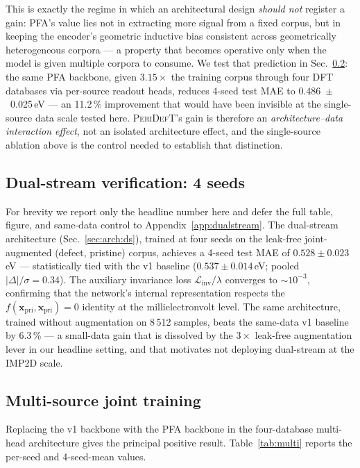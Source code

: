 \documentclass[11pt,a4paper]{article}
\newcommand{\modelname}{\textsc{PeriDefT}}
\begin{document}
This is exactly the regime in which an architectural design
\emph{should not} register a gain: PFA's value lies not in extracting
more signal from a fixed corpus, but in keeping the encoder's
geometric inductive bias consistent across geometrically
heterogeneous corpora --- a property that becomes operative only
when the model is given multiple corpora to consume. We test that
prediction in Sec.~\ref{sec:multi}: the same PFA backbone, given
$3.15\times$ the training corpus through four DFT databases via
per-source readout heads, reduces 4-seed test MAE to
0.486~$\pm$~0.025\,eV --- an 11.2\,\% improvement that would have
been invisible at the single-source data scale tested here.
\modelname's gain is therefore an
\emph{architecture--data interaction effect}, not an isolated
architecture effect, and the single-source ablation above is the
control needed to establish that distinction.

\subsection{Dual-stream verification: 4 seeds}\label{sec:dualstream}

For brevity we report only the headline number here and defer the
full table, figure, and same-data control to
Appendix~\ref{app:dualstream}. The dual-stream architecture
(Sec.~\ref{sec:arch:ds}), trained at four seeds on the leak-free
joint-augmented (defect, pristine) corpus, achieves a 4-seed test MAE
of $0.528 \pm 0.023$\,eV --- statistically tied with the v1 baseline
($0.537 \pm 0.014$\,eV; pooled $|\Delta|/\sigma = 0.34$). The
auxiliary invariance loss
$\mathcal{L}_{\mathrm{inv}}/\lambda$ converges to $\sim 10^{-3}$,
confirming that the network's internal representation respects the
$f(\mathbf{x}_{\mathrm{pri}}, \mathbf{x}_{\mathrm{pri}}) = 0$
identity at the millielectronvolt level. The same architecture,
trained without augmentation on 8\,512 samples, beats the same-data
v1 baseline by 6.3\,\% --- a small-data gain that is dissolved by
the $3\times$ leak-free augmentation lever in our headline setting,
and that motivates not deploying dual-stream at the IMP2D scale.

\subsection{Multi-source joint training}\label{sec:multi}

Replacing the v1 backbone with the PFA backbone in the four-database
multi-head architecture gives the principal positive result.
Table~\ref{tab:multi} reports the per-seed and 4-seed-mean values.
\end{document}

